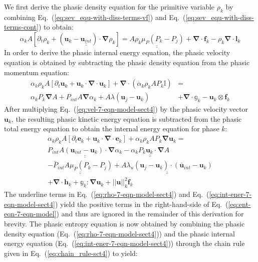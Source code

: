 \documentclass[preprint,10pt]{elsarticle}
\renewcommand{\div}{\mbold{\nabla}\! \cdot \!}
\newcommand{\grad}{\mbold{\nabla}}
\newcommand{\mbold}[1]{\boldsymbol#1}
\newcommand{\eqt}[1]{Eq.~(\ref{#1})}                     %
\begin{document}
%
We first derive the phasic density equation for the primitive variable $\rho_k$ by combining \eqt{eq:sev_equ-with-diss-terms-vf} and \eqt{eq:sev_equ-with-diss-terms-cont} to obtain:
%
\begin{equation}\label{eq:rho-7-eqn-model-sect4}
\alpha_k A \left[ \partial_t \rho_k + \left( \mbold u_k - \underline{\underline{\mbold u_{int}}} \right) \cdot \grad \rho_k \right] = \underline{\underline{A \rho_k \mu_P \left( P_k - P_j \right)}} + \div \mbold f_k - \rho_k \div \mbold l_k
\end{equation}
%
In order to derive the phasic internal energy equation, the phasic velocity equation is obtained by subtracting the phasic density equation from the phasic momentum equation:
%
\begin{align}\label{eq:vel-7-eqn-model-sect4}
\alpha_k \rho_k  A \left[ \partial_t \mbold u_k + \mbold u_k \cdot \div \mbold u_k \right]  + \div \left( \alpha_k \rho_k A P_k \mathbb{I} \right) &=\nonumber\\
\alpha_k P_k \grad A + P_{int} A \grad \alpha_k + A \lambda \left( \mbold u_j - \mbold u_k \right) &+ \div \mathbb{g}_k - \mbold u_k \otimes \mbold f_k
\end{align}
%
After multiplying \eqt{eq:vel-7-eqn-model-sect4} by the phasic velocity vector $\mbold u_k$, the resulting phasic kinetic energy equation is subtracted from the phasic total energy equation to obtain the internal energy equation for phase $k$:
%
\begin{multline}\label{eq:int-ener-7-eqn-model-sect4}
\alpha_k \rho_k  A \left[ \partial_t \mbold e_k + \mbold u_k \cdot \div \mbold e_k \right]  + \alpha_k \rho_k A P_k \grad \mbold u_k = \\
\underline{\underline{P_{int} A \left(\mbold u_{int}-\mbold u_k \right) \cdot \grad \alpha_k}} -  \underline{\underline{\alpha_k P_k \mbold u_k \cdot \grad A}} \\ 
\underline{\underline{-\bar{P}_{int} A \mu_P \left(P_k-P_j \right)}} + \underline{\underline{A \lambda_u \left(\mbold u_j-\mbold u_k  \right) \cdot \left(\bar{\mbold u}_{int}- \mbold u_k \right)}}\\
+ \div \mbold h_k + \mathbb{g}_k : \grad \mbold u_k + || \mbold u ||^2_k \mbold f_k
\end{multline}
%
The underline terms in \eqt{eq:rho-7-eqn-model-sect4} and \eqt{eq:int-ener-7-eqn-model-sect4} yield the positive terms in the right-hand-side of \eqt{eq:ent-eqn-7-eqn-model} and thus are ignored in the remainder of this derivation for brevity. The phasic entropy equation is now obtained by combining the phasic density equation (\eqt{eq:rho-7-eqn-model-sect4}) and the phasic internal energy equation (\eqt{eq:int-ener-7-eqn-model-sect4}) through the chain rule given in \eqt{eq:chain_rule-sct4} to yield:
\end{document}
